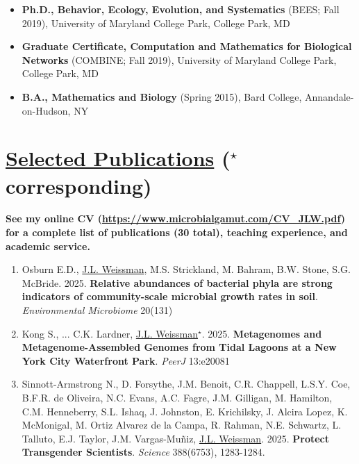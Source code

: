 \documentclass[]{res}
\begin{document}
\begin{resume}
\begin{itemize}[leftmargin=*]
\begin{itemize}[leftmargin=*]
\setlength\itemsep{0.5em}
\item[] {\bf Ph.D., Behavior, Ecology, Evolution, and Systematics} (BEES; Fall 2019),
University of Maryland College Park, College Park, MD

\item[] {\bf Graduate Certificate, Computation and Mathematics for Biological Networks} (COMBINE; Fall 2019),
University of Maryland College Park, College Park, MD

\item[]  {\bf B.A., Mathematics and Biology}  (Spring 2015), Bard College, Annandale-on-Hudson, NY
\end{itemize}

 
 \end{itemize}

 
 \section{\underline{Selected Publications} ($^\star$corresponding)} \vspace{1mm}
 {\bf See my online CV (\url{https://www.microbialgamut.com/CV_JLW.pdf}) for a complete list of publications (30 total), teaching experience, and academic service.}

\begin{enumerate}[leftmargin=*]
 \setlength\itemsep{0.2em}
 
\item Osburn E.D., \underline{J.L. Weissman}, M.S. Strickland, M. Bahram, B.W. Stone, S.G. McBride. 2025. {\bf Relative abundances of bacterial phyla are strong indicators of community-scale microbial growth rates in soil}. \emph{Environmental Microbiome} 20(131)
 
\item Kong S., ... C.K. Lardner, \underline{J.L. Weissman$^\star$}. 2025. {\bf Metagenomes and Metagenome-Assembled Genomes from Tidal Lagoons at a New York City Waterfront Park}. \emph{PeerJ} 13:e20081
 
\item Sinnott-Armstrong N., D. Forsythe, J.M. Benoit, C.R. Chappell, L.S.Y. Coe, B.F.R. de Oliveira, N.C. Evans, A.C. Fagre, J.M. Gilligan, M. Hamilton, C.M. Henneberry, S.L. Ishaq, J. Johnston, E. Krichilsky, J. Alcira Lopez, K. McMonigal, M. Ortiz Alvarez de la Campa, R. Rahman, N.E. Schwartz, L. Talluto, E.J. Taylor, J.M. Vargas-Muñiz, \underline{J.L. Weissman}. 2025. {\bf Protect Transgender Scientists}. \emph{Science}  388(6753), 1283-1284.
 

\end{enumerate}
\end{resume}
\end{document}

